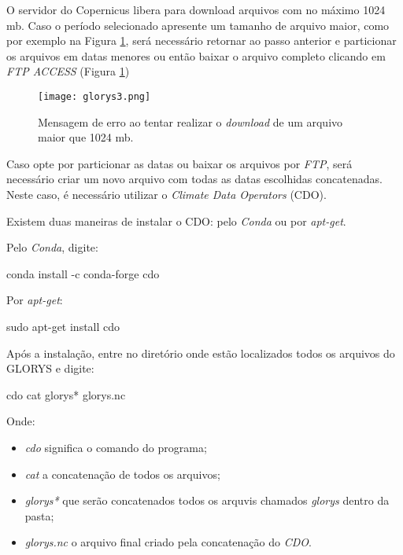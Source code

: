 \noindent O servidor do Copernicus libera para download arquivos com no máximo 1024 mb. Caso o período selecionado apresente um tamanho de arquivo maior, como por exemplo na Figura \textcolor{bleu_cite}{\ref{glorys3}}, será necessário retornar ao passo anterior e particionar os arquivos em datas menores ou então baixar o arquivo completo clicando em \textit{FTP ACCESS} (Figura \textcolor{bleu_cite}{\ref{glorys3}})
\bigskip

\begin{figure}[H]
    \centering
    \texttt{[image: glorys3.png]}
    \caption{Mensagem de erro ao tentar realizar o \textit{download} de um arquivo maior que 1024 mb.}
    \label{glorys3}
\end{figure}
\bigskip


\noindent Caso opte por particionar as datas ou baixar os arquivos por \textit{FTP}, será necessário criar um novo arquivo com todas as datas escolhidas concatenadas. Neste caso, é necessário utilizar o \textit{Climate Data Operators} (CDO). 
\bigskip

\noindent Existem duas maneiras de  instalar o CDO: pelo \textit{Conda} ou por \textit{apt-get}.
\bigskip

\noindent Pelo \textit{Conda}, digite:
\bigskip

\begin{bashcode}
conda install -c conda-forge cdo
\end{bashcode}
\bigskip

\noindent Por \textit{apt-get}:
\bigskip

\begin{bashcode}
sudo apt-get install cdo
\end{bashcode}
\bigskip

\noindent Após a instalação, entre no diretório onde estão localizados todos os arquivos do GLORYS e digite:
\bigskip

\begin{bashcode}
cdo cat glorys* glorys.nc
\end{bashcode}
\bigskip

\noindent Onde: 
\bigskip

\begin{itemize}
    \item  \textit{cdo} significa o comando do programa;
    \item \textit{cat} a concatenação de todos os arquivos;
    \item \textit{glorys*} que serão concatenados todos os arquvis chamados \textit{glorys} dentro da pasta; 
    \item \textit{glorys.nc} o arquivo final criado pela concatenação do \textit{CDO}.
\end{itemize}
\bigskip

